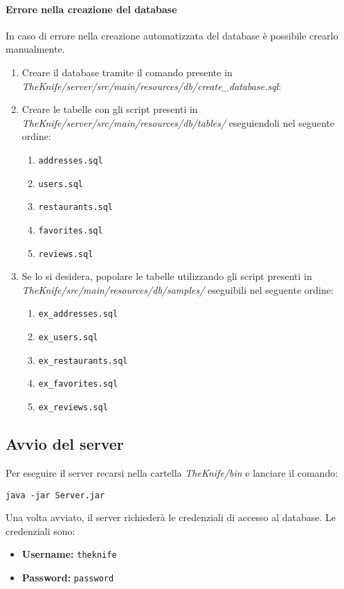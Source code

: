 \paragraph{Errore nella creazione del database}
In caso di errore nella creazione automatizzata del database è 
possibile crearlo manualmente.
\begin{enumerate}
    \item Creare il database tramite il comando presente 
    in \textit{TheKnife/server/src/main/resources/db/create\_database.sql}:
    \item Creare le tabelle con gli script presenti in 
    \textit{TheKnife/server/src/main/resources/db/tables/}
    eseguiendoli nel seguente ordine:
    \begin{enumerate}
        \item \texttt{addresses.sql}
        \item \texttt{users.sql}
        \item \texttt{restaurants.sql}
        \item \texttt{favorites.sql}
        \item \texttt{reviews.sql}
    \end{enumerate}
    \item Se lo si desidera, popolare le tabelle utilizzando gli script
    presenti in \textit{TheKnife/src/main/resources/db/samples/} 
    eseguibili nel seguente ordine:
    \begin{enumerate}
        \item \texttt{ex\_addresses.sql}
        \item \texttt{ex\_users.sql}
        \item \texttt{ex\_restaurants.sql}
        \item \texttt{ex\_favorites.sql}
        \item \texttt{ex\_reviews.sql}
    \end{enumerate}
\end{enumerate}

\subsection{Avvio del server}
Per eseguire il server recarsi nella cartella \textit{TheKnife/bin} 
e lanciare il comando:
\begin{verbatim}
java -jar Server.jar
\end{verbatim}
Una volta avviato, il server richiederà le credenziali di accesso al database.
Le credenziali sono:
\begin{itemize}
    \item \textbf{Username:} \texttt{theknife}
    \item \textbf{Password:} \texttt{password}
\end{itemize}

